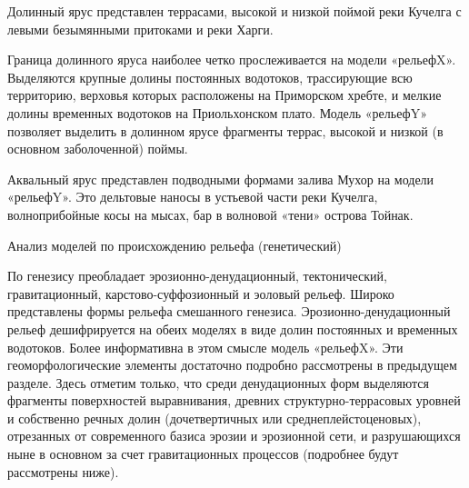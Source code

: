 \documentclass[runningheads]{AIIT}
\begin{document}
Долинный ярус представлен террасами, высокой и низкой поймой реки Кучелга с левыми безымянными притоками и реки Харги.

Граница долинного яруса наиболее четко прослеживается на модели «рельефX». Выделяются крупные долины постоянных водотоков, трассирующие всю территорию, верховья которых расположены на Приморском хребте, и мелкие долины временных водотоков на Приольхонском плато. Модель «рельефY» позволяет выделить в долинном ярусе фрагменты террас, высокой и низкой (в основном заболоченной) поймы.

Аквальный ярус представлен подводными формами залива Мухор на модели «рельефY». Это дельтовые наносы в устьевой части реки Кучелга, волноприбойные косы на мысах, бар в волновой «тени» острова Тойнак.

Анализ моделей по происхождению рельефа (генетический)

По генезису преобладает эрозионно-денудационный, тектонический, гравитационный, карстово-суффозионный и эоловый рельеф. Широко представлены формы рельефа смешанного генезиса.
Эрозионно-денудационный рельеф дешифрируется на обеих моделях в виде долин постоянных и временных водотоков. Более информативна в этом смысле модель «рельефX». Эти геоморфологические элементы достаточно подробно рассмотрены в предыдущем разделе. Здесь отметим только, что среди денудационных форм выделяются фрагменты поверхностей выравнивания, древних структурно-террасовых уровней и собственно речных долин (дочетвертичных или среднеплейстоценовых), отрезанных от современного базиса эрозии и эрозионной сети, и разрушающихся ныне в основном за счет гравитационных процессов (подробнее будут рассмотрены ниже).
\end{document}
